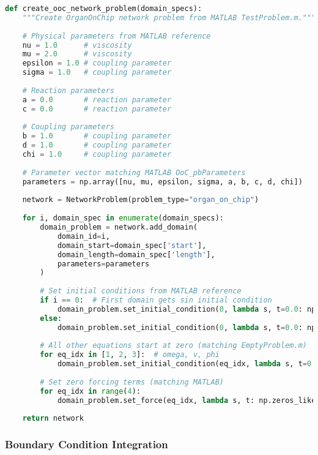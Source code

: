 \begin{lstlisting}[language=Python, caption=OrganOnChip Network Parameters]
def create_ooc_network_problem(domain_specs):
    """Create OrganOnChip network problem from MATLAB TestProblem.m."""
    
    # Physical parameters from MATLAB reference
    nu = 1.0      # viscosity
    mu = 2.0      # viscosity
    epsilon = 1.0 # coupling parameter
    sigma = 1.0   # coupling parameter
    
    # Reaction parameters
    a = 0.0       # reaction parameter
    c = 0.0       # reaction parameter
    
    # Coupling parameters  
    b = 1.0       # coupling parameter
    d = 1.0       # coupling parameter
    chi = 1.0     # coupling parameter
    
    # Parameter vector matching MATLAB OoC_pbParameters
    parameters = np.array([nu, mu, epsilon, sigma, a, b, c, d, chi])
    
    network = NetworkProblem(problem_type="organ_on_chip")
    
    for i, domain_spec in enumerate(domain_specs):
        domain_problem = network.add_domain(
            domain_id=i,
            domain_start=domain_spec['start'],
            domain_length=domain_spec['length'],
            parameters=parameters
        )
        
        # Set initial conditions from MATLAB reference
        if i == 0:  # First domain gets sin initial condition
            domain_problem.set_initial_condition(0, lambda s, t=0.0: np.sin(2*np.pi*s))
        else:
            domain_problem.set_initial_condition(0, lambda s, t=0.0: np.zeros_like(s))
            
        # All other equations start at zero (matching EmptyProblem.m)
        for eq_idx in [1, 2, 3]:  # omega, v, phi
            domain_problem.set_initial_condition(eq_idx, lambda s, t=0.0: np.zeros_like(s))
        
        # Set zero forcing terms (matching MATLAB)
        for eq_idx in range(4):
            domain_problem.set_force(eq_idx, lambda s, t: np.zeros_like(s))
    
    return network
\end{lstlisting}

\subsubsection{Boundary Condition Integration}

